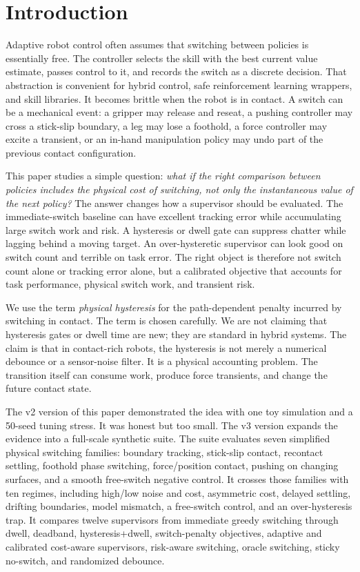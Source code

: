 \documentclass{article}
\begin{document}
\section{Introduction}

Adaptive robot control often assumes that switching between policies is essentially free.
The controller selects the skill with the best current value estimate, passes control to it, and records the switch as a discrete decision.
That abstraction is convenient for hybrid control, safe reinforcement learning wrappers, and skill libraries.
It becomes brittle when the robot is in contact.
A switch can be a mechanical event: a gripper may release and reseat, a pushing controller may cross a stick-slip boundary, a leg may lose a foothold, a force controller may excite a transient, or an in-hand manipulation policy may undo part of the previous contact configuration.

This paper studies a simple question:
\emph{what if the right comparison between policies includes the physical cost of switching, not only the instantaneous value of the next policy?}
The answer changes how a supervisor should be evaluated.
The immediate-switch baseline can have excellent tracking error while accumulating large switch work and risk.
A hysteresis or dwell gate can suppress chatter while lagging behind a moving target.
An over-hysteretic supervisor can look good on switch count and terrible on task error.
The right object is therefore not switch count alone or tracking error alone, but a calibrated objective that accounts for task performance, physical switch work, and transient risk.

We use the term \emph{physical hysteresis} for the path-dependent penalty incurred by switching in contact.
The term is chosen carefully.
We are not claiming that hysteresis gates or dwell time are new; they are standard in hybrid systems.
The claim is that in contact-rich robots, the hysteresis is not merely a numerical debounce or a sensor-noise filter.
It is a physical accounting problem.
The transition itself can consume work, produce force transients, and change the future contact state.

The v2 version of this paper demonstrated the idea with one toy simulation and a 50-seed tuning stress.
It was honest but too small.
The v3 version expands the evidence into a full-scale synthetic suite.
The suite evaluates seven simplified physical switching families:
boundary tracking, stick-slip contact, recontact settling, foothold phase switching, force/position contact, pushing on changing surfaces, and a smooth free-switch negative control.
It crosses those families with ten regimes, including high/low noise and cost, asymmetric cost, delayed settling, drifting boundaries, model mismatch, a free-switch control, and an over-hysteresis trap.
It compares twelve supervisors from immediate greedy switching through dwell, deadband, hysteresis+dwell, switch-penalty objectives, adaptive and calibrated cost-aware supervisors, risk-aware switching, oracle switching, sticky no-switch, and randomized debounce.
\end{document}
